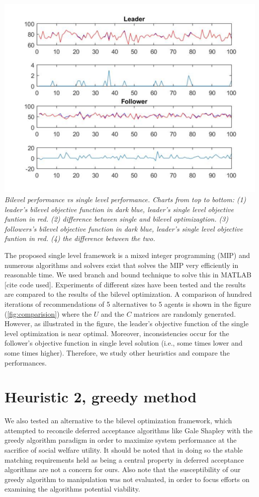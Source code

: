 \documentclass[11pt, letterpaper]{article}
\begin{document}
\includegraphics[]{comparison.png}
\\
\caption{\emph{Bilevel performance vs single level performance. Charts from top to bottom: (1) leader's bilevel objective function in dark blue, leader's single level objective funtion in red. (2) difference between single and bilevel optimizagtion. (3) followers's bilevel objective function in dark blue, leader's single level objective funtion in red. (4) the difference between the two. }}   
\label{fig:comparision}
\noindent

The proposed single level framework is a mixed integer programming (MIP) and numerous algorithms and solvers exist that solves the MIP very efficiently in reasonable time. We used branch and bound technique to solve this in MATLAB [cite code used]. Experiments of different sizes have been tested and the results are compared to the results of the bilevel optimization. A comparison of hundred iterations of recommendations of 5 alternatives to 5 agents is shown in the figure (\ref{fig:comparision}) where the $U$ and the $C$ matrices are randomly generated. However, as illustrated in the figure, the leader's objective function of the single level optimization is near optimal. Moreover, inconsistencies occur for the follower's objective function in single level solution (i.e., some times lower and some times higher). Therefore, we study other heuristics and compare the performances. 

\section{Heuristic 2, greedy method}
We also tested an alternative to the bilevel optimization framework, which attempted to reconcile deferred acceptance algorithms like Gale Shapley with the greedy algorithm paradigm in order to maximize system performance at the sacrifice of social welfare utility.  It should be noted that in doing so the stable matching requirements held as being a central property in deferred acceptance algorithms are not a concern for ours.  Also note that the susceptibility of our greedy algorithm to manipulation was not evaluated, in order to focus efforts on examining the algorithms potential viability.  
\end{document}
